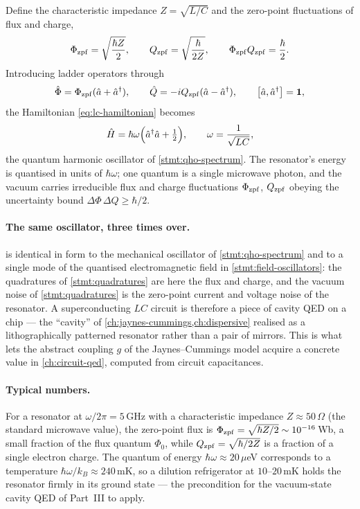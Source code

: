 \begin{statement}
\label{stmt:lc-oscillator}
Define the characteristic impedance $Z=\sqrt{L/C}$ and the
zero-point fluctuations of flux and charge,
\begin{equation}
\label{eq:zpf}
\Phi_{\rm zpf}=\sqrt{\frac{\hbar Z}{2}},
\qquad
Q_{\rm zpf}=\sqrt{\frac{\hbar}{2Z}},
\qquad
\Phi_{\rm zpf}Q_{\rm zpf}=\frac{\hbar}{2}.
\end{equation}
Introducing ladder operators through
\begin{equation}
\label{eq:lc-ladder}
\op\Phi=\Phi_{\rm zpf}(\hat a+\hat a^\dagger),
\qquad
\op Q=-iQ_{\rm zpf}(\hat a-\hat a^\dagger),
\qquad
\comm{\hat a}{\hat a^\dagger}=\id,
\end{equation}
the Hamiltonian \cref{eq:lc-hamiltonian} becomes
\begin{equation}
\label{eq:lc-qho}
\hat{H} = \hbar\omega\Bigl(\hat a^\dagger\hat a + \tfrac12\Bigr),
\qquad
\omega=\frac{1}{\sqrt{LC}},
\end{equation}
the quantum harmonic oscillator of \cref{stmt:qho-spectrum}. The
resonator's energy is quantised in units of $\hbar\omega$; one quantum
is a single microwave photon, and the vacuum carries irreducible
flux and charge fluctuations $\Phi_{\rm zpf}$, $Q_{\rm zpf}$ obeying
the uncertainty bound $\Delta\Phi\,\Delta Q\geq\hbar/2$.
\end{statement}

\paragraph{The same oscillator, three times over.}
 is identical in form to the mechanical oscillator of
\cref{stmt:qho-spectrum} and to a single mode of the quantised
electromagnetic field in \cref{stmt:field-oscillators}: the
quadratures of \cref{stmt:quadratures} are here the flux and charge,
and the vacuum noise of \cref{stmt:quadratures} is the zero-point
current and voltage noise of the resonator. A superconducting $LC$
circuit is therefore a piece of cavity QED on a chip --- the
``cavity'' of \cref{ch:jaynes-cummings,ch:dispersive} realised as a
lithographically patterned resonator rather than a pair of mirrors.
This is what lets the abstract coupling $g$ of the Jaynes--Cummings
model acquire a concrete value in \cref{ch:circuit-qed}, computed from
circuit capacitances.

\paragraph{Typical numbers.}
For a resonator at $\omega/2\pi=5\,$GHz with a characteristic
impedance $Z\approx50\,\Omega$ (the standard microwave value), the
zero-point flux is $\Phi_{\rm zpf}=\sqrt{\hbar Z/2}\sim10^{-16}\,$Wb,
a small fraction of the flux quantum $\Phi_0$, while
$Q_{\rm zpf}=\sqrt{\hbar/2Z}$ is a fraction of a single electron
charge. The quantum of energy $\hbar\omega\approx20\,\mu$eV
corresponds to a temperature $\hbar\omega/k_B\approx240\,$mK, so a
dilution refrigerator at $10$--$20\,$mK holds the resonator firmly in
its ground state --- the precondition for the vacuum-state cavity
QED of Part~III to apply.

